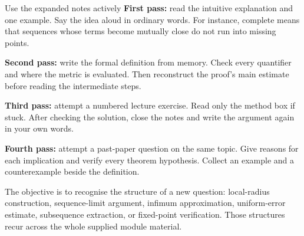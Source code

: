\begin{note}{Use the expanded notes actively}
\textbf{First pass:} read the intuitive explanation and one example. Say the idea aloud in ordinary words. For instance, complete means that sequences whose terms become mutually close do not run into missing points.

\textbf{Second pass:} write the formal definition from memory. Check every quantifier and where the metric is evaluated. Then reconstruct the proof's main estimate before reading the intermediate steps.

\textbf{Third pass:} attempt a numbered lecture exercise. Read only the method box if stuck. After checking the solution, close the notes and write the argument again in your own words.

\textbf{Fourth pass:} attempt a past-paper question on the same topic. Give reasons for each implication and verify every theorem hypothesis. Collect an example and a counterexample beside the definition.

The objective is to recognise the structure of a new question: local-radius construction, sequence-limit argument, infimum approximation, uniform-error estimate, subsequence extraction, or fixed-point verification. Those structures recur across the whole supplied module material.
\end{note}



